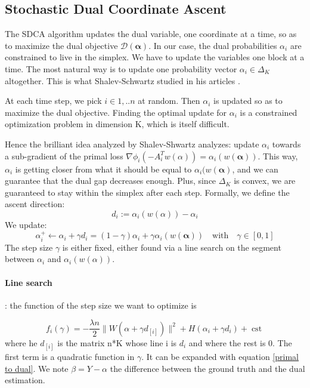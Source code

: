 \documentclass{article}
\DeclareMathOperator{\cst}{cst}
\DeclareMathOperator{\1}{\mathbb{1}}
\begin{document}
\subsection{Stochastic Dual Coordinate Ascent}
The SDCA algorithm updates the dual variable, one coordinate at a time, so as to maximize the dual objective $\mathscr D(\bm \alpha)$.
In our case, the dual probabilities $\alpha_i$ are constrained to live in the simplex.
We have to update the variables one block at a time.
The most natural way is to update one probability vector $\alpha_i \in \Delta_K$ altogether.
This is what Shalev-Schwartz studied in his articles \cite{shalev-shwartz_accelerated_2013-1}.

At each time step, we pick $i\in{1,..n}$ at random.
Then $\alpha_i$ is updated so as to maximize the dual objective.
Finding the optimal update for $\alpha_i$ is a constrained optimization problem in dimension K, which is itself difficult. 

Hence the brilliant idea analyzed by Shalev-Shwartz analyzes: update $\alpha_i$ towards a sub-gradient of the primal loss $\nabla\phi_i( - A_i^Tw(\alpha)) = \alpha_i(w(\bm \alpha))$.
This way, $\alpha_i$ is getting closer from what it should be equal to $\alpha_i(w(\bm \alpha)$, and we can guarantee that the dual gap decreases enough.
Plus, since $\Delta_K$ is convex, we are guaranteed to stay within the simplex after each step.  
Formally, we define the ascent direction: 
\begin{equation*}
	d_i := \alpha_i(w(\alpha)) - \alpha_i
\end{equation*} 
We update:
\begin{equation*}
	\alpha_i^+ \leftarrow \alpha_i + \gamma d_i = (1-\gamma)\alpha_i + \gamma \alpha_i(w(\bm \alpha)) \quad \textrm{with} \quad \gamma \in [0,1]
\end{equation*}
The step size $\gamma$ is either fixed, either found via a line search on the segment between $\alpha_i$ and $\alpha_i(w(\alpha))$.

\paragraph{Line search }: the function of the step size we want to optimize is 

\begin{equation}
	\label{line search 1}
	f_i(\gamma) = -\frac{\lambda n}{2} \|W(\alpha + \gamma d_{[i]})\|^2 + H(\alpha_i + \gamma d_i) + \cst
\end{equation}
where he $d_{[i]}$ is the matrix n*K whose line i is $d_i$ and where the rest is 0.
The first term is a quadratic function in $\gamma$.
It can be expanded with equation \ref{primal to dual}.
We note $\beta = Y - \alpha$ the difference between the ground truth and the dual estimation. 
\end{document}
